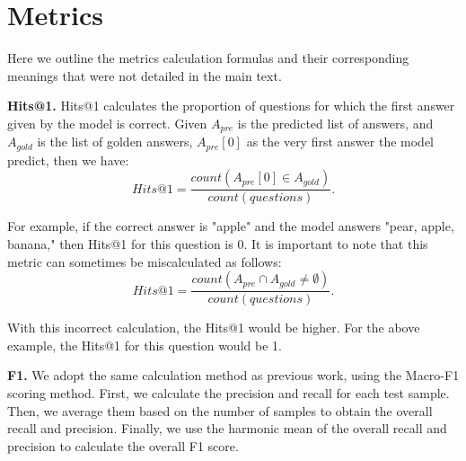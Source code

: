 \documentclass[11pt]{article}
\begin{document}
\section{Metrics}
\label{sec:appendix_C}

Here we outline the metrics calculation formulas and their corresponding meanings that were not detailed in the main text. 

\noindent\textbf{Hits@1.} Hits@1 calculates the proportion of questions for which the first answer given by the model is correct. Given $A_{pre}$ is the predicted list of answers, and $A_{gold}$ is the list of golden answers, $A_{pre}[0]$ as the very first answer the model predict, then we have:
\begin{equation}
    Hits@1=\frac{count(A_{pre}[0]\in A_{gold})}{count(questions)}.
\end{equation}

For example, if the correct answer is "apple" and the model answers "pear, apple, banana," then Hits@1 for this question is 0. It is important to note that this metric can sometimes be miscalculated as follows:
\begin{equation}
    Hits@1=\frac{count(A_{pre}\cap A_{gold} \neq \emptyset)}{count(questions)}.
\end{equation}

With this incorrect calculation, the Hits@1 would be higher. For the above example, the Hits@1 for this question would be 1.

\noindent\textbf{F1.} We adopt the same calculation method as previous work, using the Macro-F1 scoring method. First, we calculate the precision and recall for each test sample. Then, we average them based on the number of samples to obtain the overall recall and precision. Finally, we use the harmonic mean of the overall recall and precision to calculate the overall F1 score.

\begin{table}[]
\caption{The average Hits@1 performance on questions with different subgraph structures. Manually add minimum branch threshold during tree search process. The performance drops as we manually add the threshold.}
\label{table:thres}
\end{table}
\end{document}
